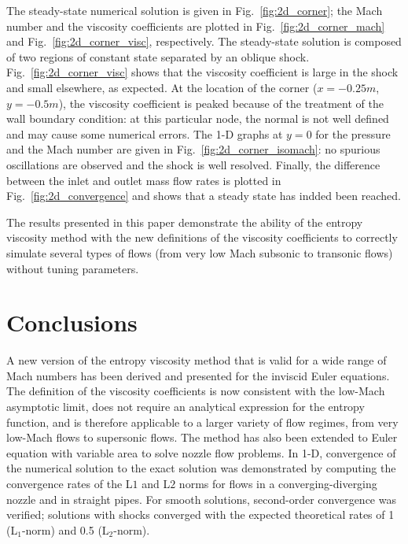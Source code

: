 \documentclass[preprint,10pt]{elsarticle}
\newcommand{\fig}[1]{Fig.~\ref{#1}}                      %
\begin{document}
%
The steady-state numerical solution is given in \fig{fig:2d_corner}; the Mach number and the viscosity 
coefficients are plotted in \fig{fig:2d_corner_mach} and \fig{fig:2d_corner_visc}, respectively. The 
steady-state solution is composed of two regions of constant state separated by an oblique shock. 
\fig{fig:2d_corner_visc} shows that the viscosity coefficient is large in the shock and small elsewhere, 
as expected. At the location of the corner ($x=-0.25m$, $y=-0.5m$), the viscosity coefficient is peaked 
because of the treatment of the wall boundary condition: at this particular node, the normal is not well 
defined and may cause some numerical errors. The 1-D graphs at $y=0$ for the pressure and the Mach number 
are given in \fig{fig:2d_corner_isomach}: no spurious oscillations are observed and the shock is well resolved. 
Finally, the difference between the inlet and outlet mass flow rates is plotted in \fig{fig:2d_convergence} 
and shows that a steady state has indded been reached. 

The results presented in this paper demonstrate the ability of the entropy viscosity method with the new definitions of the viscosity coefficients 
to correctly simulate several types of flows (from very low Mach subsonic to transonic flows) without tuning parameters.


\section{Conclusions} \label{sec:ccl}

A new version of the entropy viscosity method that is valid for a wide range of Mach numbers has been derived 
and presented for the inviscid Euler equations.
The definition of the viscosity coefficients
is now consistent with the low-Mach asymptotic limit, does not require an analytical expression 
for the entropy function, and is therefore applicable to a larger variety of flow regimes, from very 
low-Mach flows to supersonic flows. 
The method has also been extended to Euler equation with variable area to solve nozzle flow problems.
In 1-D, convergence of the numerical solution to 
the exact solution was demonstrated by computing the convergence rates of the L$1$ and L$2$ norms 
for flows in a converging-diverging nozzle and in straight pipes. For smooth solutions, second-order 
convergence was verified; solutions with shocks converged with the expected theoretical rates of 1 (L$_1$-norm)
and 0.5 (L$_2$-norm).
\end{document}
